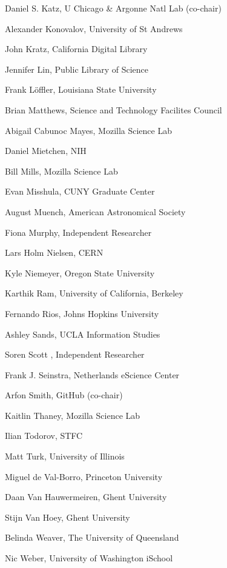\documentclass[11pt, oneside]{amsart}
\begin{document}
Daniel S. Katz, U Chicago \& Argonne Natl Lab (co-chair)

Alexander Konovalov, University of St Andrews

John Kratz, California Digital Library	

Jennifer Lin, Public Library of Science	

Frank L\"offler, Louisiana State University	

Brian Matthews, Science and Technology Facilites Council	

Abigail Cabunoc Mayes, Mozilla Science Lab	

Daniel Mietchen, NIH	

Bill Mills, Mozilla Science Lab	

Evan Misshula, CUNY Graduate Center	

August Muench, American Astronomical Society	

Fiona Murphy, Independent Researcher	

Lars Holm Nielsen, CERN	

Kyle Niemeyer, Oregon State University	

Karthik Ram, University of California, Berkeley	

Fernando Rios, Johns Hopkins University	

Ashley Sands, UCLA Information Studies	


Soren Scott , Independent Researcher

Frank J. Seinstra, Netherlands eScience Center

Arfon Smith, GitHub (co-chair)

Kaitlin Thaney, Mozilla Science Lab

Ilian Todorov, STFC

Matt Turk, University of Illinois

Miguel de Val-Borro, Princeton University

Daan Van Hauwermeiren, Ghent University

Stijn Van Hoey, Ghent University

Belinda Weaver, The University of Queensland

Nic Weber, University of Washington iSchool



\end{document}
